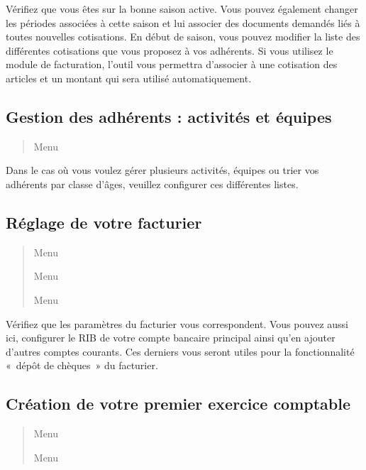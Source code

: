 \documentclass[a4paper,10pt,oneside,french]{sphinxmanual}
\begin{document}
Vérifiez que vous êtes sur la bonne saison active. Vous pouvez également changer les périodes associées à cette saison et lui associer des documents demandés liés à toutes nouvelles cotisations.
En début de saison, vous pouvez modifier la liste des différentes cotisations que vous proposez à vos adhérents.
Si vous utilisez le module de facturation, l’outil vous permettra d’associer à une cotisation des articles et un montant qui sera utilisé automatiquement.


\subsection{Gestion des adhérents : activités et équipes}
\label{\detokenize{asso/first_step:gestion-des-adherents-activites-et-equipes}}\begin{quote}

Menu 
\end{quote}

Dans le cas où vous voulez gérer plusieurs activités, équipes ou trier vos adhérents par classe d’âges, veuillez configurer ces différentes listes.


\subsection{Réglage de votre facturier}
\label{\detokenize{asso/first_step:reglage-de-votre-facturier}}\begin{quote}

Menu 

Menu 

Menu 
\end{quote}

Vérifiez que les paramètres du facturier vous correspondent.
Vous pouvez aussi ici, configurer le RIB de votre compte bancaire principal ainsi qu’en ajouter d’autres comptes courants.
Ces derniers vous seront utiles pour la fonctionnalité « dépôt de chèques » du facturier.


\subsection{Création de votre premier exercice comptable}
\label{\detokenize{asso/first_step:creation-de-votre-premier-exercice-comptable}}\begin{quote}

Menu 

Menu 
\end{quote}
\end{document}
